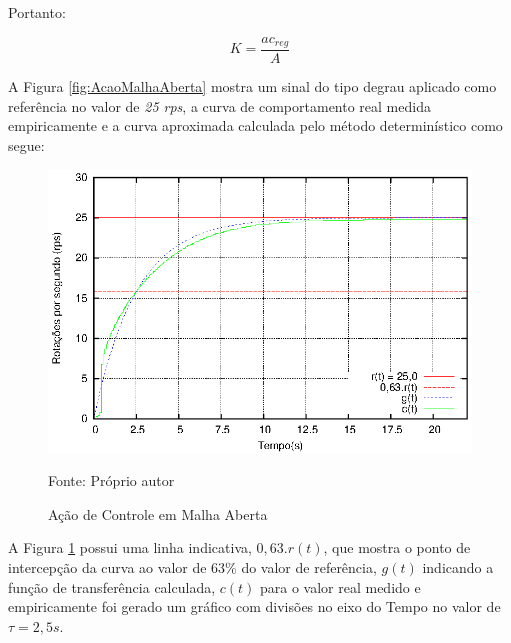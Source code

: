 Portanto:

\begin{equation}
K = \frac{ac_{reg}}{A}
\label{eq:calcK}
\end{equation}








A Figura \ref{fig:AcaoMalhaAberta} mostra um sinal do tipo degrau aplicado como referência no valor de \emph{25 rps}, a curva de comportamento real medida empiricamente e a curva aproximada calculada pelo método determinístico como segue:

\begin{figure}[!htb]
\centering
\caption{Ação de Controle em Malha Aberta}
\center\includegraphics[scale=1.4]{./imagens/acaoMalhaAbertaTau.eps}
\label{fig:acaoMalhaAberTau}

{\small Fonte: Próprio autor}
\end{figure}

A Figura \ref{fig:acaoMalhaAberTau} possui uma linha indicativa, $0,63.r(t)$, que mostra o ponto de intercepção da curva ao valor de 63\% do valor de referência, $g(t)$ indicando a função de transferência calculada, $c(t)$ para o valor real medido e empiricamente foi gerado um gráfico com divisões no eixo do Tempo no valor de $\tau = 2,5 s $.




